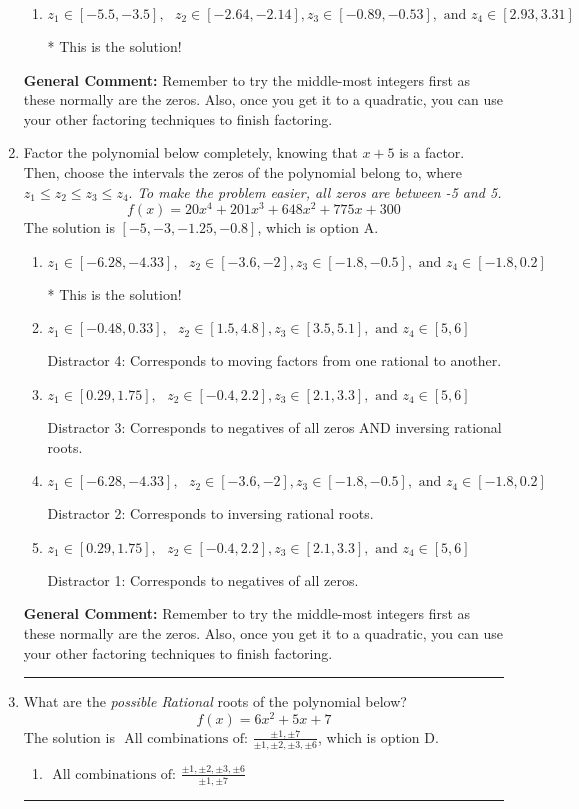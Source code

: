\documentclass{extbook}[14pt]
\newcommand{\litem}[1]{\item #1

\rule{\textwidth}{0.4pt}}
\begin{document}
\begin{enumerate}
{\begin{enumerate}[label=\Alph*.]
 Distractor 4: Corresponds to moving factors from one rational to another.
\item \( z_1 \in [-5.5, -3.5], \text{   }  z_2 \in [-2.64, -2.14], z_3 \in [-0.89, -0.53], \text{   and   } z_4 \in [2.93, 3.31] \)

* This is the solution!
\end{enumerate}

\textbf{General Comment:} Remember to try the middle-most integers first as these normally are the zeros. Also, once you get it to a quadratic, you can use your other factoring techniques to finish factoring.
}
\litem{
Factor the polynomial below completely, knowing that $x+5$ is a factor. Then, choose the intervals the zeros of the polynomial belong to, where $z_1 \leq z_2 \leq z_3 \leq z_4$. \textit{To make the problem easier, all zeros are between -5 and 5.}
\[ f(x) = 20x^{4} +201 x^{3} +648 x^{2} +775 x + 300 \]The solution is \( [-5, -3, -1.25, -0.8] \), which is option A.\begin{enumerate}[label=\Alph*.]
\item \( z_1 \in [-6.28, -4.33], \text{   }  z_2 \in [-3.6, -2], z_3 \in [-1.8, -0.5], \text{   and   } z_4 \in [-1.8, 0.2] \)

* This is the solution!
\item \( z_1 \in [-0.48, 0.33], \text{   }  z_2 \in [1.5, 4.8], z_3 \in [3.5, 5.1], \text{   and   } z_4 \in [5, 6] \)

 Distractor 4: Corresponds to moving factors from one rational to another.
\item \( z_1 \in [0.29, 1.75], \text{   }  z_2 \in [-0.4, 2.2], z_3 \in [2.1, 3.3], \text{   and   } z_4 \in [5, 6] \)

 Distractor 3: Corresponds to negatives of all zeros AND inversing rational roots.
\item \( z_1 \in [-6.28, -4.33], \text{   }  z_2 \in [-3.6, -2], z_3 \in [-1.8, -0.5], \text{   and   } z_4 \in [-1.8, 0.2] \)

 Distractor 2: Corresponds to inversing rational roots.
\item \( z_1 \in [0.29, 1.75], \text{   }  z_2 \in [-0.4, 2.2], z_3 \in [2.1, 3.3], \text{   and   } z_4 \in [5, 6] \)

 Distractor 1: Corresponds to negatives of all zeros.
\end{enumerate}

\textbf{General Comment:} Remember to try the middle-most integers first as these normally are the zeros. Also, once you get it to a quadratic, you can use your other factoring techniques to finish factoring.
}
\litem{
What are the \textit{possible Rational} roots of the polynomial below?
\[ f(x) = 6x^{2} +5 x + 7 \]The solution is \( \text{ All combinations of: }\frac{\pm 1,\pm 7}{\pm 1,\pm 2,\pm 3,\pm 6} \), which is option D.\begin{enumerate}[label=\Alph*.]
\item \( \text{ All combinations of: }\frac{\pm 1,\pm 2,\pm 3,\pm 6}{\pm 1,\pm 7} \)


\end{enumerate}}
\end{enumerate}
\end{document}
